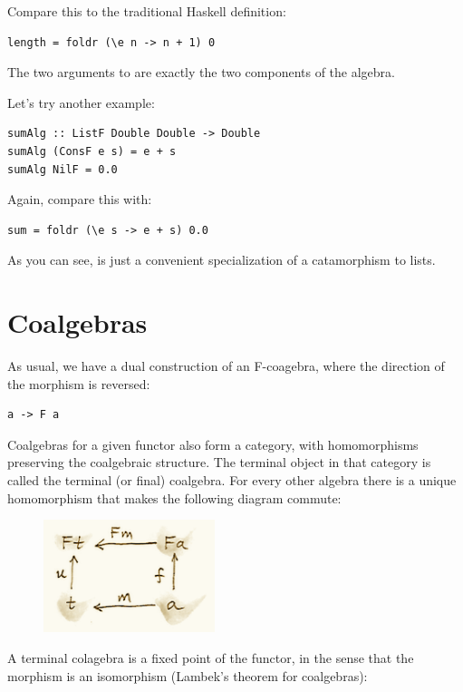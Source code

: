 Compare this to the traditional Haskell definition:

\begin{Verbatim}
length = foldr (\e n -> n + 1) 0
\end{Verbatim}
The two arguments to  are exactly the two components of
the algebra.

Let's try another example:

\begin{Verbatim}[commandchars=\\\{\}]
sumAlg :: ListF Double Double -> Double
sumAlg (ConsF e s) = e + s
sumAlg NilF = 0.0
\end{Verbatim}
Again, compare this with:

\begin{Verbatim}
sum = foldr (\e s -> e + s) 0.0
\end{Verbatim}
As you can see,  is just a convenient specialization of a
catamorphism to lists.

\section{Coalgebras}\label{coalgebras}

As usual, we have a dual construction of an F-coagebra, where the
direction of the morphism is reversed:

\begin{Verbatim}[commandchars=\\\{\}]
a -> F a
\end{Verbatim}
Coalgebras for a given functor also form a category, with homomorphisms
preserving the coalgebraic structure. The terminal object
 in that category is called the terminal (or final)
coalgebra. For every other algebra  there is a unique
homomorphism  that makes the following diagram commute:

\begin{figure}[H]
\centering
\includegraphics[width=50mm]{images/alg7.png}
\end{figure}

\noindent
A terminal colagebra is a fixed point of the functor, in the sense that
the morphism  is an isomorphism
(Lambek's theorem for coalgebras):

